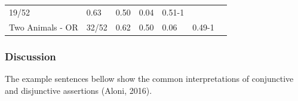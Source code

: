 \documentclass[floatsintext,man]{apa6}
\theoremstyle{definition}
\theoremstyle{definition}
\theoremstyle{definition}
\theoremstyle{remark}
\begin{document}
\begin{longtable}[]{@{}lllllll@{}}
\begin{minipage}[t]{0.19\columnwidth}
19/52\strut
\end{minipage} & \begin{minipage}[t]{0.08\columnwidth}\raggedright\strut
0.63\strut
\end{minipage} & \begin{minipage}[t]{0.08\columnwidth}\raggedright\strut
0.50\strut
\end{minipage} & \begin{minipage}[t]{0.08\columnwidth}\raggedright\strut
0.04\strut
\end{minipage} & \begin{minipage}[t]{0.08\columnwidth}\raggedright\strut
0.51-1\strut
\end{minipage} & \begin{minipage}[t]{0.08\columnwidth}\raggedright\strut
\strut
\end{minipage}\tabularnewline
\begin{minipage}[t]{0.23\columnwidth}\raggedright\strut
Two Animals - OR\strut
\end{minipage} & \begin{minipage}[t]{0.19\columnwidth}\raggedright\strut
32/52\strut
\end{minipage} & \begin{minipage}[t]{0.08\columnwidth}\raggedright\strut
0.62\strut
\end{minipage} & \begin{minipage}[t]{0.08\columnwidth}\raggedright\strut
0.50\strut
\end{minipage} & \begin{minipage}[t]{0.08\columnwidth}\raggedright\strut
0.06\strut
\end{minipage} & \begin{minipage}[t]{0.08\columnwidth}\raggedright\strut
0.49-1\strut
\end{minipage} & \begin{minipage}[t]{0.08\columnwidth}\raggedright\strut
\strut
\end{minipage}\tabularnewline
\bottomrule
\end{longtable}

\subsubsection{Discussion}\label{discussion}

The example sentences bellow show the common interpretations of
conjunctive and disjunctive assertions (Aloni, 2016).
\end{document}
